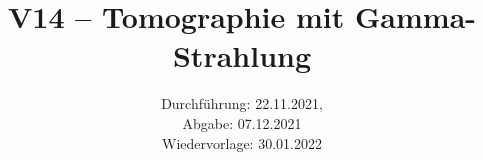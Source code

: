 \title{V14 – Tomographie mit Gamma-Strahlung}
\date{Durchführung: 22.11.2021, \\ Abgabe: 07.12.2021 \\ Wiedervorlage: 30.01.2022}
